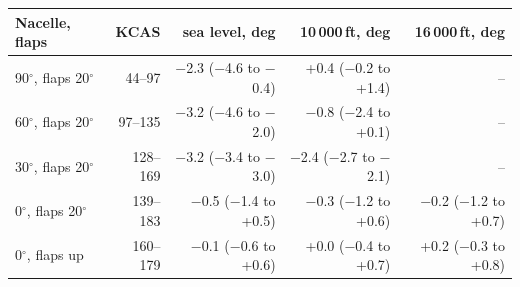 \begin{tabular}{@{}lrrrr@{}}
\toprule
Nacelle, flaps & KCAS & sea level, deg & 10\,000\,ft, deg & 16\,000\,ft, deg \\
\midrule
90$^\circ$, flaps 20$^\circ$ & 44--97 & $-$2.3 ($-$4.6 to $-$0.4) & +0.4 ($-$0.2 to +1.4) & -- \\
60$^\circ$, flaps 20$^\circ$ & 97--135 & $-$3.2 ($-$4.6 to $-$2.0) & $-$0.8 ($-$2.4 to +0.1) & -- \\
30$^\circ$, flaps 20$^\circ$ & 128--169 & $-$3.2 ($-$3.4 to $-$3.0) & $-$2.4 ($-$2.7 to $-$2.1) & -- \\
0$^\circ$, flaps 20$^\circ$ & 139--183 & $-$0.5 ($-$1.4 to +0.5) & $-$0.3 ($-$1.2 to +0.6) & $-$0.2 ($-$1.2 to +0.7) \\
0$^\circ$, flaps up & 160--179 & $-$0.1 ($-$0.6 to +0.6) & +0.0 ($-$0.4 to +0.7) & +0.2 ($-$0.3 to +0.8) \\
\bottomrule
\end{tabular}
